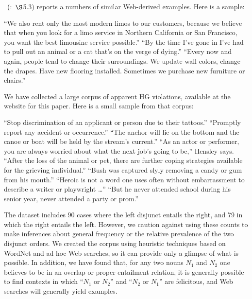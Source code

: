 \documentclass[12pt,twoside]{article}
\newcommand{\seccitet}[2]{\citeauthor{#1}~(\citeyear{#1}:~$\S$#2)}
\newcommand{\highlight}[1]{{\color{maroon}#1}}
\renewcommand{\_}{\textbf{\textunderscore\hspace{-4pt}\textunderscore\hspace{-3pt}\textunderscore\hspace{-4pt}\textunderscore}\hspace{0.5pt}}			%
\begin{document}
\seccitet{Russell:2012}{5.3} reports a numbers of similar Web-derived
examples. Here is a sample:
%
\begin{exe}
\ex\label{rusell-hg}
  \begin{xlist}
    \ex ``We also rent only the most modern limos to our customers,
    because we believe that when you look for a limo service in
    \highlight{Northern California or San Francisco}, you want the
    best limousine service possible.''
    \ex ``By the time I've gone in I've had to pull out an
    \highlight{animal or a cat} that's on the verge of dying.''
    \ex ``Every now and again, people tend to change their
    surroundings. We update wall colors, change the drapes. Have new
    flooring installed. Sometimes we purchase new \highlight{furniture
      or chairs}.''
  \end{xlist}
\end{exe}

We have collected a large corpus of apparent HG violations, available
at the website for this paper. Here is a small sample from that
corpus:
%
\begin{exe}
\ex\label{ourcorpus} 
  \begin{xlist}
  \ex ``Stop discrimination of an \highlight{applicant or person} due
    to their tattoos.''
  \ex ``Promptly report any \highlight{accident or occurrence}.''
  \ex ``The anchor will lie on the bottom and the \highlight{canoe or
      boat} will be held by the stream's current.''
  \ex ``As an \highlight{actor or performer}, you are always worried
    about what the next job's going to be,'' Hensley says.
  \ex ``After the loss of the \highlight{animal or pet}, there are
    further coping strategies available for the grieving individual.''
  \ex ``Bush was captured slyly removing \highlight{a candy or gum}
    from his mouth.''
  \ex ``Heroic is not a word one uses often without embarrassment to
    describe a \highlight{writer or playwright} \ldots''
  \ex ``But he never attended school during his senior year, never
    attended a \highlight{party or prom}.''
  \end{xlist}
\end{exe}

The dataset includes 90 cases where the left disjunct entails the
right, and 79 in which the right entails the left.  However, we
caution against using these counts to make inferences about general
frequency or the relative prevalence of the two disjunct orders. We
created the corpus using heuristic techniques based on WordNet
\citep{WordNet98} and ad hoc Web searches, so it can provide only a
glimpse of what is possible.  In addition, we have found that, for any
two nouns $N_{1}$ and $N_{2}$ one believes to be in an overlap or
proper entailment relation, it is generally possible to find contexts
in which ``$N_{1}$ or $N_{2}$'' and ``$N_{2}$ or $N_{1}$'' are
felicitous, and Web searches will generally yield examples.
\end{document}
